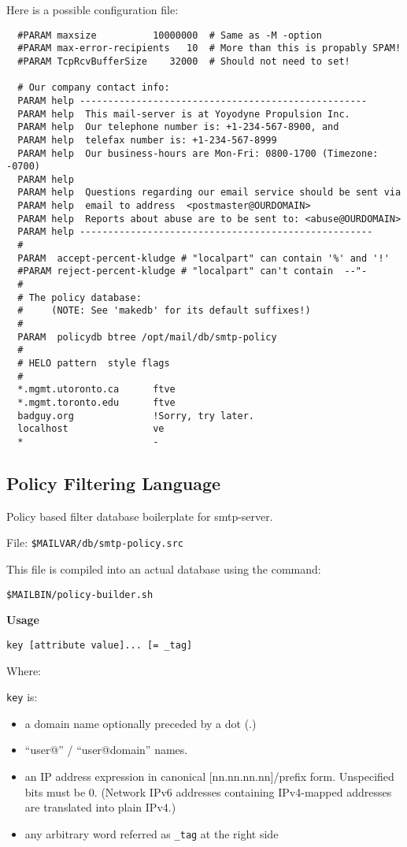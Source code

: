 Here is a possible configuration file:

\begin{verbatim}
  #PARAM maxsize          10000000  # Same as -M -option
  #PARAM max-error-recipients   10  # More than this is propably SPAM! 
  #PARAM TcpRcvBufferSize    32000  # Should not need to set!

  # Our company contact info:
  PARAM help ---------------------------------------------------
  PARAM help  This mail-server is at Yoyodyne Propulsion Inc. 
  PARAM help  Our telephone number is: +1-234-567-8900, and 
  PARAM help  telefax number is: +1-234-567-8999
  PARAM help  Our business-hours are Mon-Fri: 0800-1700 (Timezone: -0700) 
  PARAM help
  PARAM help  Questions regarding our email service should be sent via 
  PARAM help  email to address  <postmaster@OURDOMAIN>
  PARAM help  Reports about abuse are to be sent to: <abuse@OURDOMAIN> 
  PARAM help ----------------------------------------------------
  #
  PARAM  accept-percent-kludge # "localpart" can contain '%' and '!' 
  #PARAM reject-percent-kludge # "localpart" can't contain  --"-
  #
  # The policy database:
  #     (NOTE: See 'makedb' for its default suffixes!)
  #
  PARAM  policydb btree /opt/mail/db/smtp-policy
  #
  # HELO pattern  style flags
  #
  *.mgmt.utoronto.ca      ftve
  *.mgmt.toronto.edu      ftve
  badguy.org              !Sorry, try later.
  localhost               ve
  *                       -
\end{verbatim}



\subsection{Policy Filtering Language}
\label{ref:smtp_policy_filtering}


Policy based filter database boilerplate for smtp-server.

File:  {\tt \$MAILVAR/db/smtp-policy.src}

This file is compiled into an actual database using the command:

{\tt \$MAILBIN/policy-builder.sh}

{\bf Usage}

{\tt  key [attribute value]... [= \_tag]}

Where:

{\tt key} is: 

\begin{itemize}
\item a domain name optionally preceded by a dot (.)
\item ``user@'' / ``user@domain'' names.
\item an IP address expression in canonical [nn.nn.nn.nn]/prefix form. 
Unspecified bits must be 0. (Network IPv6 addresses containing IPv4-mapped 
addresses are translated into plain IPv4.)
\item any arbitrary word referred as {\tt \_tag} at the right side
\end{itemize}

